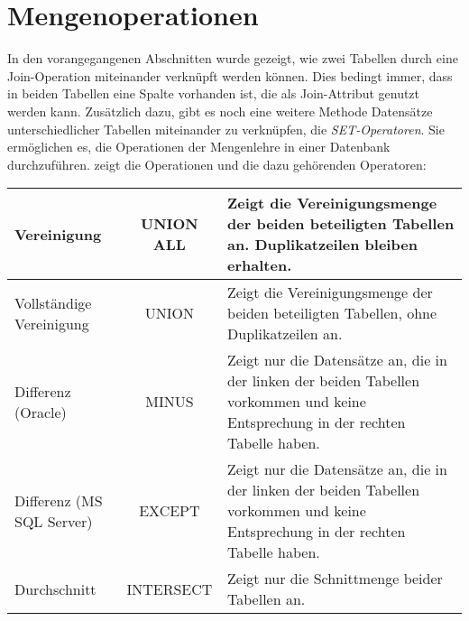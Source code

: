 \section{Mengenoperationen}
In den vorangegangenen Abschnitten wurde gezeigt, wie zwei Tabellen durch eine Join-Operation miteinander verknüpft werden können. Dies bedingt immer, dass in beiden Tabellen eine Spalte vorhanden ist, die als Join-Attribut genutzt werden kann. Zusätzlich dazu, gibt es noch eine weitere Methode Datensätze unterschiedlicher Tabellen miteinander zu verknüpfen, die \textit{SET-Operatoren}. Sie ermöglichen es, die Operationen der Mengenlehre in einer Datenbank durchzuführen.  zeigt die Operationen und die dazu gehörenden  Operatoren:
\begin{center}
    \label{setoperators}
    \begin{small}
        \tabletail{
            \hline
        }
        \tablelasttail {
            \hline
        }
        \begin{supertabular}{|l|c|p{8cm}|}
            Vereinigung & UNION ALL& Zeigt die Vereinigungsmenge der beiden beteiligten Tabellen an. Duplikatzeilen bleiben erhalten. \\
            \hline
            Vollständige Vereinigung & UNION & Zeigt die Vereinigungsmenge der beiden beteiligten Tabellen, ohne Duplikatzeilen an. \\
            \hline
            Differenz (Oracle) & MINUS  & Zeigt nur die Datensätze an, die in der linken der beiden Tabellen vorkommen und keine Entsprechung in der rechten Tabelle haben.\\
            \hline
            Differenz (MS SQL Server) & EXCEPT  & Zeigt nur die Datensätze an, die in der linken der beiden Tabellen vorkommen und keine Entsprechung in der rechten Tabelle haben.\\
            \hline
            Durchschnitt & INTERSECT & Zeigt nur die Schnittmenge beider Tabellen an.\\
        \end{supertabular}
    \end{small}
\end{center}
